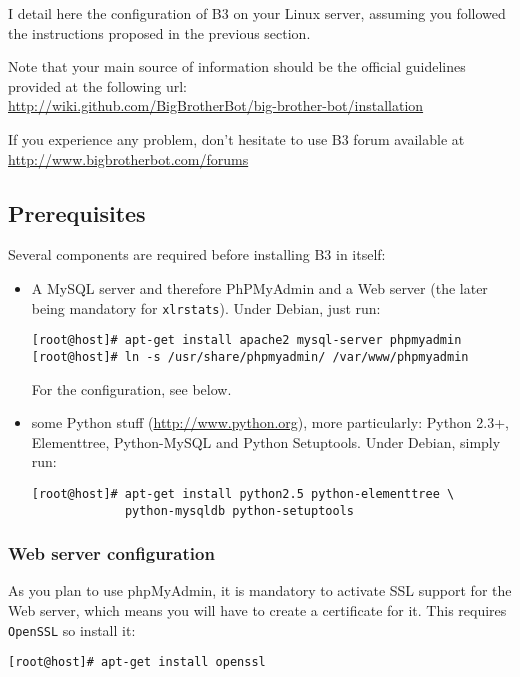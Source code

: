 I detail here the configuration of B3 on your Linux server, assuming you
followed the instructions proposed in the previous section.

Note that your main source of information should be the official guidelines
provided at the following url:\\ 
\url{http://wiki.github.com/BigBrotherBot/big-brother-bot/installation}

If you experience any problem, don't hesitate to use B3 forum available at 
\url{http://www.bigbrotherbot.com/forums} 

\subsection{Prerequisites}
\label{sec:b3:prerequisite}

Several components are required before installing B3 in itself: 
\begin{itemize}
\item A MySQL server and therefore PhPMyAdmin and a Web server (the later being
  mandatory for \texttt{xlrstats}).
  Under Debian, just run: 
  \begin{lstlisting}[style=command]
[root@host]# apt-get install apache2 mysql-server phpmyadmin
[root@host]# ln -s /usr/share/phpmyadmin/ /var/www/phpmyadmin
  \end{lstlisting}
  For the configuration, see below. 
\item some Python stuff (\url{http://www.python.org}), more particularly: 
  Python 2.3+, Elementtree, Python-MySQL and Python Setuptools. Under Debian,
  simply run: 
  \begin{lstlisting}[style=command]
[root@host]# apt-get install python2.5 python-elementtree \ 
             python-mysqldb python-setuptools
  \end{lstlisting}
\end{itemize}

\subsubsection{Web server configuration}
\label{sub:b3:apache}

As you plan to use phpMyAdmin, it is mandatory to activate SSL support for the
Web server, which means you will have to create a certificate for it.
This requires \texttt{OpenSSL} so install it: 
  \begin{lstlisting}[style=command]
[root@host]# apt-get install openssl
  \end{lstlisting}

